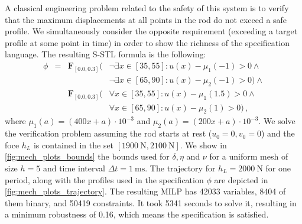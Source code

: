 \documentclass[letterpaper, 10 pt, conference]{ieeeconf/ieeeconf}
\newcommand{\Event}{\mathbf{F}}
\begin{document}

A classical engineering problem related to the safety of this system is to
verify that the maximum displacements at all points in the rod do not exceed a
safe profile. We simultaneously consider the opposite requirement (exceeding a
target profile at some point in time) in order to show the richness of the
specification language. The resulting S-STL formula is the following:
%
\begin{equation}
\begin{aligned}
    \phi &= & \Event_{[0.0, 0.3]} \big ( & \lnot \exists x \in [35, 55]: u(x) -
        \mu_1(-1) > 0 \land \\
    & & &\lnot \exists x \in [65, 90]: u(x) - \mu_2(-1) > 0 \big)
    \land \\
    & & \Event_{[0.0, 0.3]} \big ( & \forall x \in [35, 55]: u(x) - \mu_1(1.5) > 0 \land \\
    & & & \forall x \in [65, 90]: u(x) - \mu_2(1) > 0 \big ) \,,
    \end{aligned}
\end{equation}
%
where $\mu_1(a) = (400x + a) \cdot 10^{-3}$ and $\mu_2(a) = (200x + a) \cdot
10^{-3}$.
We solve the verification problem assuming the rod starts at rest ($u_0 = 0,
v_0 = 0$) and the foce $h_L$ is contained in the set $[\SI{1900}{\newton},
\SI{2100}{\newton}]$. We show in
\cref{fig:mech_plots_bounds} the bounds used for $\delta, \eta$ and $\nu$ for a
uniform mesh of size $h=5$ and time interval $\Delta t = \SI{1}{\milli\second}$. 
The trajectory for $h_L = \SI{2000}{\newton}$ for one period, 
along with the profiles used in the
specification $\phi$ are depicted in \cref{fig:mech_plots_trajectory}. 
The resulting MILP has 42033
variables, 8404 of them binary, and 50419 constraints. It took 5341 seconds to
solve it, resulting in a minimum robustness of 0.16, which means the
specification is satisfied.
\end{document}
